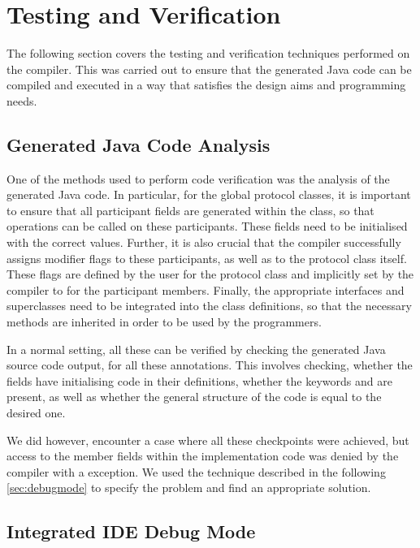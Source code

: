 \cleardoublepage
\chapter{Testing and Verification}
\label{ch:testing}

The following section covers the testing and verification techniques performed on the compiler. This was carried out to ensure that the generated Java code can be compiled and executed in a way that satisfies the design aims and programming needs.

\section{Generated Java Code Analysis}

One of the methods used to perform code verification was the analysis of the generated Java code. In particular, for the global protocol classes, it is important to ensure that all participant fields are generated within the class, so that operations can be called on these participants. These fields need to be initialised with the correct values. Further, it is also crucial that the compiler successfully assigns modifier flags to these participants, as well as to the protocol class itself. These flags are defined by the user for the protocol class and implicitly set by the compiler to  for the participant members. Finally, the appropriate interfaces and superclasses need to be integrated into the class definitions, so that the necessary methods are inherited in order to be used by the programmers.

In a normal setting, all these can be verified by checking the generated Java source code output, for all these annotations. This involves checking, whether the fields have initialising code in their definitions, whether the keywords  and  are present, as well as whether the general structure of the code is equal to the desired one.

We did however, encounter a case where all these checkpoints were achieved, but access to the member fields within the implementation code was denied by the compiler with a  exception. We used the technique described in the following \autoref{sec:debugmode} to specify the problem and find an appropriate solution.

\section{Integrated IDE Debug Mode}
\label{sec:debugmode}

